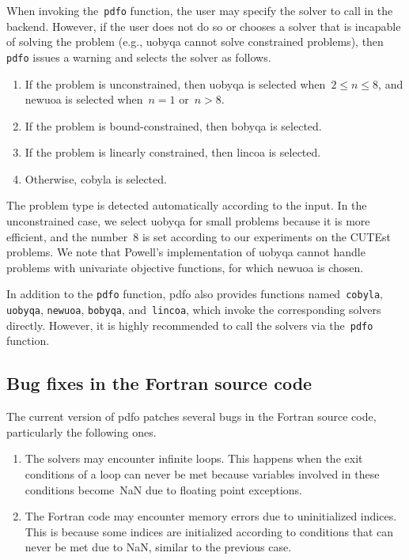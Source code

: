 \documentclass[
    smallextended,  %
    final,        %
]{svjour3}
\newcommand{\iter}[1][k]{x\ifthenelse{\equal{#1}{}}{}{_{#1}}}
\newcommand{\xpt}[1][k]{\mathcal{Y}\ifthenelse{\equal{#1}{}}{}{_{#1}}}
\newcommand{\pdfofun}{\texttt{pdfo}\xspace}
\newcommand{\cobylafun}{\texttt{cobyla}\xspace}
\newcommand{\newuoafun}{\texttt{newuoa}\xspace}
\newcommand{\bobyqafun}{\texttt{bobyqa}\xspace}
\newcommand{\lincoafun}{\texttt{lincoa}\xspace}
\begin{document}
When invoking the~\pdfofun function, the user may specify the solver to call in the backend.
However, if the user does not do so or chooses a solver that is incapable of solving the problem (e.g., \gls{uobyqa} cannot solve
constrained problems), then \pdfofun issues a warning and selects the solver as follows.
\begin{enumerate}
    \item If the problem is unconstrained, then \gls{uobyqa} is selected when~$2 \le n \le 8$, and \gls{newuoa} is selected when~$n = 1$ or~$n > 8$.
    \item If the problem is bound-constrained, then \gls{bobyqa} is selected.
    \item If the problem is linearly constrained, then \gls{lincoa} is selected.
    \item Otherwise, \gls{cobyla} is selected.
\end{enumerate}
The problem type is detected automatically according to the input.
In the unconstrained case, we select \gls{uobyqa} for small problems because it is more efficient,
and the number~$8$ is set according to our experiments on the CUTEst~\cite{Gould_Orban_Toint_2015} problems.
We note that Powell's implementation of \gls{uobyqa} cannot handle problems with univariate
objective functions, for which \gls{newuoa} is chosen.

In addition to the \pdfofun function, \gls{pdfo} also provides functions named~\cobylafun,
\texttt{uobyqa}, \newuoafun, \bobyqafun, and~\lincoafun, which invoke the
corresponding solvers directly. However, it is highly recommended to call the solvers
via the~\pdfofun function.

\subsection{Bug fixes in the Fortran source code}
\label{subsec:bug-corrections}

The current version of \gls{pdfo} patches several bugs in the Fortran source code, particularly the following ones.
\begin{enumerate}
    \item The solvers may encounter infinite loops.
    This happens when the exit conditions of a loop can never be met because variables involved in
    these conditions become~NaN due to floating point exceptions.
    \item The Fortran code may encounter memory errors due to uninitialized indices.
    This is because some indices are initialized according to conditions that can never be met due to NaN, similar to the previous case.
\end{enumerate}
\end{document}
